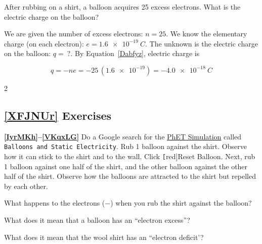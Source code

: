 \documentclass[dvipsnames]{article}
\numberwithin{equation}{section}
\numberwithin{figure}{section}
\begin{document}
\begin{example}
    After rubbing on a shirt, a balloon acquires 25 excess electrons. What is the electric charge on the balloon?
\end{example}

\Solution We are given the number of excess electrons: $n = 25$. We know the elementary charge (on each electron): $e = \SI{1.6e-19}{C}$. The unknown is the electric charge on the balloon: $q =\ ?$. By Equation~\ref{Dabfyz}, electric charge is

\begin{equation*}
    q = - n e = -25\,(\num{1.6e-19}) = \SI{-4.0e-18}{C}
\end{equation*}

\cyanhrule

\begin{multicols}{2}

\subsection*{\ref{XFJNUr} Exercises}

\textbf{\ref{IyrMKh}--\ref{VKqxLG}} Do a Google search for the \href{https://phet.colorado.edu/en/simulations/balloons-and-static-electricity/about}{PhET Simulation} called \texttt{Balloons and Static Electricity}. Rub 1 balloon against the shirt. Observe how it can stick to the shirt and to the wall. Click \texttt[red]{Reset Balloon}.
Next, rub 1 balloon against one half of the shirt, and the other balloon against the other half of the shirt. Observe how the balloons are attracted to the shirt but repelled by each other.

\begin{exercise} \label{IyrMKh}
    What happens to the electrons ($-$) when you rub the shirt against the balloon?
\end{exercise}




\begin{exercise}
    What does it mean that a balloon has an ``electron excess''?
\end{exercise}

\begin{exercise}
    What does it mean that the wool shirt has an ``electron deficit'?
\end{exercise}


\end{multicols}
\end{document}
